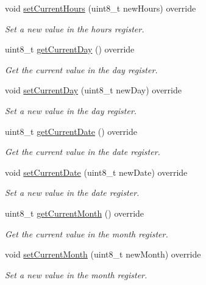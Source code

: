 \begin{DoxyCompactItemize}
void \mbox{\hyperlink{class_d_s3231_ae59c15abcccd8e27eadebcd150db810e}{set\+Current\+Hours}} (uint8\+\_\+t new\+Hours) override
\begin{DoxyCompactList}\small\item\em Set a new value in the hours register. \end{DoxyCompactList}\item 
uint8\+\_\+t \mbox{\hyperlink{class_d_s3231_a813bbe55a08e1911d498511795721477}{get\+Current\+Day}} () override
\begin{DoxyCompactList}\small\item\em Get the current value in the day register. \end{DoxyCompactList}\item 
void \mbox{\hyperlink{class_d_s3231_ae43a887db6022008c066a257acd68ae8}{set\+Current\+Day}} (uint8\+\_\+t new\+Day) override
\begin{DoxyCompactList}\small\item\em Set a new value in the day register. \end{DoxyCompactList}\item 
uint8\+\_\+t \mbox{\hyperlink{class_d_s3231_a346341a4d3c6615103b33fbff7a12884}{get\+Current\+Date}} () override
\begin{DoxyCompactList}\small\item\em Get the current value in the date register. \end{DoxyCompactList}\item 
void \mbox{\hyperlink{class_d_s3231_a597a0d5cb33f8b60f81dba9050ca1363}{set\+Current\+Date}} (uint8\+\_\+t new\+Date) override
\begin{DoxyCompactList}\small\item\em Set a new value in the date register. \end{DoxyCompactList}\item 
uint8\+\_\+t \mbox{\hyperlink{class_d_s3231_a8d7a965802afacc16b4d5af86e0ed11e}{get\+Current\+Month}} () override
\begin{DoxyCompactList}\small\item\em Get the current value in the month register. \end{DoxyCompactList}\item 
void \mbox{\hyperlink{class_d_s3231_a122611bf693cdd538178b99b893a7115}{set\+Current\+Month}} (uint8\+\_\+t new\+Month) override
\begin{DoxyCompactList}\small\item\em Set a new value in the month register. \end{DoxyCompactList}\item 

\end{DoxyCompactItemize}
